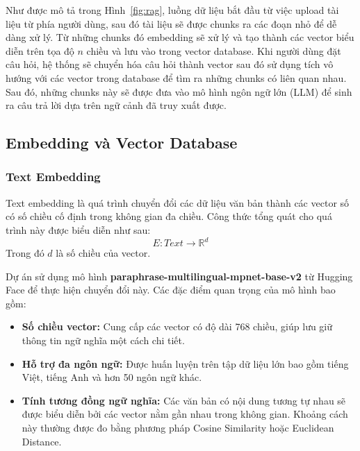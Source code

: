 \documentclass[conference]{IEEEtran}
\begin{document}
Như được mô tả trong Hình~\ref{fig:rag}, luồng dữ liệu bắt đầu từ việc upload tài liệu từ phía người dùng, sau đó tài liệu sẽ được chunks ra các đoạn nhỏ để dễ dàng xử lý. Từ những chunks đó embedding sẽ xử lý và tạo thành các vector biểu diễn trên tọa độ $n$ chiều và lưu vào trong vector database. Khi người dùng đặt câu hỏi, hệ thống sẽ chuyển hóa câu hỏi thành vector sau đó sử dụng tích vô hướng với các vector trong database để tìm ra những chunks có liên quan nhau. Sau đó, những chunks này sẽ được đưa vào mô hình ngôn ngữ lớn (LLM) để sinh ra câu trả lời dựa trên ngữ cảnh đã truy xuất được.

\subsection{Embedding và Vector Database}

\subsubsection{Text Embedding}
Text embedding là quá trình chuyển đổi các dữ liệu văn bản thành các vector số có số chiều cố định trong không gian đa chiều. Công thức tổng quát cho quá trình này được biểu diễn như sau:
\begin{equation}
  E : \textit{Text} \rightarrow \mathbb{R}^{d}
\end{equation}
Trong đó $d$ là số chiều của vector.

Dự án sử dụng mô hình \textbf{paraphrase-multilingual-mpnet-base-v2} từ Hugging Face để thực hiện chuyển đổi này. Các đặc điểm quan trọng của mô hình bao gồm:
\begin{itemize}
  \item \textbf{Số chiều vector:} Cung cấp các vector có độ dài 768 chiều, giúp lưu giữ thông tin ngữ nghĩa một cách chi tiết.
  \item \textbf{Hỗ trợ đa ngôn ngữ:} Được huấn luyện trên tập dữ liệu lớn bao gồm tiếng Việt, tiếng Anh và hơn 50 ngôn ngữ khác.
  \item \textbf{Tính tương đồng ngữ nghĩa:} Các văn bản có nội dung tương tự nhau sẽ được biểu diễn bởi các vector nằm gần nhau trong không gian. Khoảng cách này thường được đo bằng phương pháp Cosine Similarity hoặc Euclidean Distance.
\end{itemize}
\end{document}
